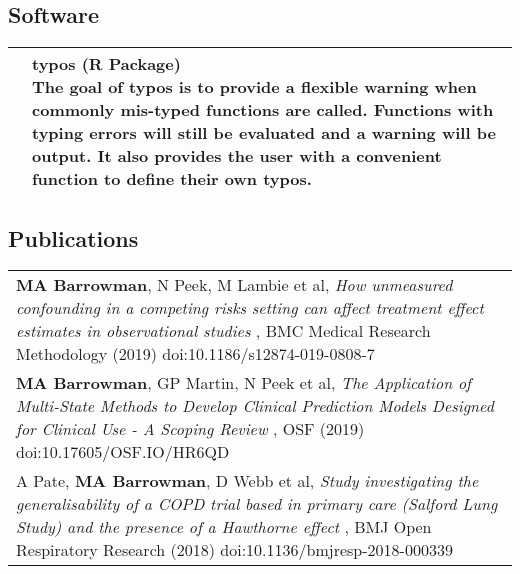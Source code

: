 \documentclass[
]{article}
\begin{document}
\hypertarget{software}{%
\subsection{Software}\label{software}}

\begin{table}[H]
\centering
\begin{tabular}{>{\raggedright\arraybackslash}p{}>{\raggedright\arraybackslash}p{}}
\toprule
\raisebox{-0.7\height}{\texttt{[image:  img/logos/typos-logo.png]}} & \makecell[tp{0.7\textwidth}]{\textbf{ typos} (R Package) \\  The goal of typos is to provide a flexible warning when commonly mis-typed functions are called. Functions with typing errors will still be evaluated and a warning will be output. It also provides the user with a convenient function to define their own typos. }\\
\bottomrule
\end{tabular}
\end{table}

\hypertarget{publications}{%
\subsection{Publications}\label{publications}}

\begin{table}[H]
\centering
\begin{tabular}{>{\raggedright\arraybackslash}p{}}
\toprule
\textbf{MA Barrowman}, N Peek, M Lambie et al, \emph{ How unmeasured confounding in a competing risks setting can affect treatment effect estimates in observational studies }, BMC Medical Research Methodology (2019) doi:10.1186/s12874-019-0808-7\\
\textbf{MA Barrowman}, GP Martin, N Peek et al, \emph{ The Application of Multi-State Methods to Develop Clinical Prediction Models Designed for Clinical Use - A Scoping Review }, OSF (2019) doi:10.17605/OSF.IO/HR6QD\\
A Pate, \textbf{MA Barrowman}, D Webb et al, \emph{ Study investigating the generalisability of a COPD trial based in primary care (Salford Lung Study) and the presence of a Hawthorne effect }, BMJ Open Respiratory Research (2018) doi:10.1136/bmjresp-2018-000339\\
\bottomrule
\end{tabular}
\end{table}
\end{document}

